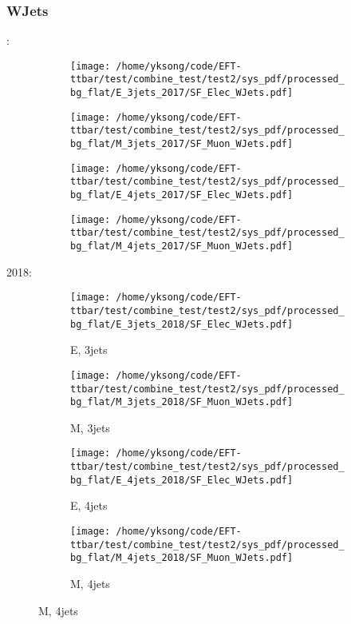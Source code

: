 \documentclass{beamer}
\begin{document}
\begin{frame}
\frametitle{WJets}
\fontsize{5}{1}:
\begin{figure}
\centering
\begin{subfigure}[b]{0.24\textwidth}
\texttt{[image: /home/yksong/code/EFT-ttbar/test/combine\_test/test2/sys\_pdf/processed\_bg\_flat/E\_3jets\_2017/SF\_Elec\_WJets.pdf]}
\end{subfigure}
\begin{subfigure}[b]{0.24\textwidth}
\texttt{[image: /home/yksong/code/EFT-ttbar/test/combine\_test/test2/sys\_pdf/processed\_bg\_flat/M\_3jets\_2017/SF\_Muon\_WJets.pdf]}
\end{subfigure}
\begin{subfigure}[b]{0.24\textwidth}
\texttt{[image: /home/yksong/code/EFT-ttbar/test/combine\_test/test2/sys\_pdf/processed\_bg\_flat/E\_4jets\_2017/SF\_Elec\_WJets.pdf]}
\end{subfigure}
\begin{subfigure}[b]{0.24\textwidth}
\texttt{[image: /home/yksong/code/EFT-ttbar/test/combine\_test/test2/sys\_pdf/processed\_bg\_flat/M\_4jets\_2017/SF\_Muon\_WJets.pdf]}
\end{subfigure}
\end{figure}
2018:
\begin{figure}
\centering
\begin{subfigure}[b]{0.24\textwidth}
\texttt{[image: /home/yksong/code/EFT-ttbar/test/combine\_test/test2/sys\_pdf/processed\_bg\_flat/E\_3jets\_2018/SF\_Elec\_WJets.pdf]}
\captionsetup{font=tiny}
\caption{E, 3jets}
\end{subfigure}
\begin{subfigure}[b]{0.24\textwidth}
\texttt{[image: /home/yksong/code/EFT-ttbar/test/combine\_test/test2/sys\_pdf/processed\_bg\_flat/M\_3jets\_2018/SF\_Muon\_WJets.pdf]}
\captionsetup{font=tiny}
\caption{M, 3jets}
\end{subfigure}
\begin{subfigure}[b]{0.24\textwidth}
\texttt{[image: /home/yksong/code/EFT-ttbar/test/combine\_test/test2/sys\_pdf/processed\_bg\_flat/E\_4jets\_2018/SF\_Elec\_WJets.pdf]}
\captionsetup{font=tiny}
\caption{E, 4jets}
\end{subfigure}
\begin{subfigure}[b]{0.24\textwidth}
\texttt{[image: /home/yksong/code/EFT-ttbar/test/combine\_test/test2/sys\_pdf/processed\_bg\_flat/M\_4jets\_2018/SF\_Muon\_WJets.pdf]}
\captionsetup{font=tiny}
\caption{M, 4jets}
\end{subfigure}
\end{figure}
\end{frame}
\end{document}
